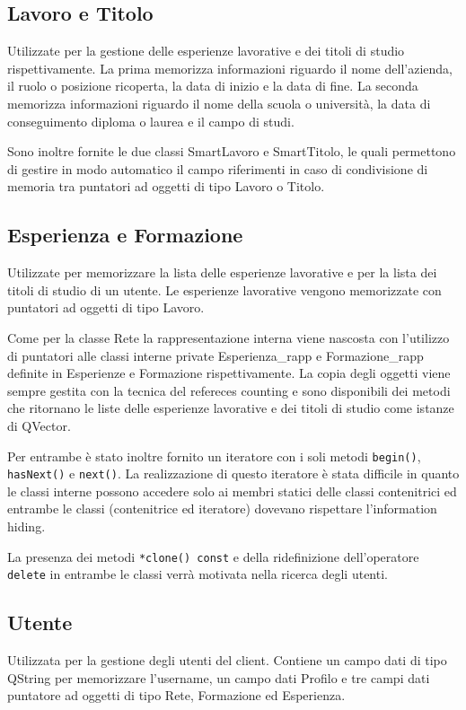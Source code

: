 \documentclass[a4paper,openany]{article}
\begin{document}
\subsection*{Lavoro e Titolo}
Utilizzate per la gestione delle esperienze lavorative e dei titoli di studio rispettivamente. La prima memorizza informazioni riguardo il nome dell'azienda, il ruolo o posizione ricoperta, la data di inizio e la data di fine. La seconda memorizza informazioni riguardo il nome della scuola o università, la data di conseguimento diploma o laurea e il campo di studi.

Sono inoltre fornite le due classi SmartLavoro e SmartTitolo, le quali permettono di gestire in modo automatico il campo riferimenti in caso di condivisione di memoria tra puntatori ad oggetti di tipo Lavoro o Titolo.

\subsection*{Esperienza e Formazione}
Utilizzate per memorizzare la lista delle esperienze lavorative e per la lista dei titoli di studio di un utente. Le esperienze lavorative vengono memorizzate con puntatori ad oggetti di tipo Lavoro. 

Come per la classe Rete la rappresentazione interna viene nascosta con l'utilizzo di puntatori alle classi interne private Esperienza\_rapp e Formazione\_rapp definite in Esperienze e Formazione rispettivamente. La copia degli oggetti viene sempre gestita con la tecnica del refereces counting e sono disponibili dei metodi che ritornano le liste delle esperienze lavorative e dei titoli di studio come istanze di QVector.

Per entrambe è stato inoltre fornito un iteratore con i soli metodi \texttt{begin()}, \texttt{hasNext()} e \texttt{next()}. La realizzazione di questo iteratore è stata difficile in quanto le classi interne possono accedere solo ai membri statici delle classi contenitrici ed entrambe le classi (contenitrice ed iteratore) dovevano rispettare l'information hiding.

La presenza dei metodi \texttt{*clone() const} e della ridefinizione dell'operatore \texttt{delete} in entrambe le classi verrà motivata nella ricerca degli utenti.

\subsection*{Utente}
Utilizzata per la gestione degli utenti del client. Contiene un campo dati di tipo QString per memorizzare l'username, un campo dati Profilo e tre campi dati puntatore ad oggetti di tipo Rete, Formazione ed Esperienza. 
\end{document}

